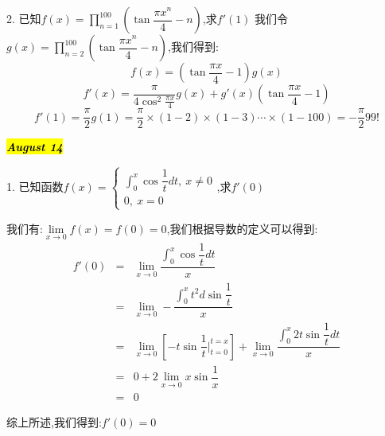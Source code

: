 2. 已知$f(x)=\prod\limits_{n=1}^{100}\left(\tan\dfrac{\pi x^n}{4}-n\right)$,求$f'(1)$
我们令$g(x)=\prod\limits_{n=2}^{100}\left(\tan\dfrac{\pi x^n}{4}-n\right)$,我们得到:$$f(x)=(\tan\dfrac{\pi x}{4}-1)g(x)$$
$$f'(x)=\dfrac{\pi}{4\cos^2\frac{\pi x}{4}}g(x)+g'(x)(\tan\dfrac{\pi x}{4}-1)$$
$$f'(1)=\dfrac{\pi}{2}g(1)=\dfrac{\pi}{2}\times(1-2)\times(1-3)\cdots\times(1-100)=-\dfrac{\pi}{2}99!$$

\hl{\textbf{\textit{August 14}}}

1. 已知函数$f(x)=\left\lbrace
\begin{array}{l}
	\int_{0}^{x}\cos\dfrac{1}{t}dt,\ x\neq 0\\
	0,\ x=0
\end{array}
\right. $,求$f'(0)$
\begin{solution}

	我们有:$\lim\limits_{x\rightarrow 0}f(x)=f(0)=0$,我们根据导数的定义可以得到:  
	\begin{eqnarray*}
		f'(0)&=&\lim\limits_{x\rightarrow 0}\dfrac{\int_{0}^{x}\cos\dfrac{1}{t}dt}{x}\\
		&=&\lim\limits_{x\rightarrow 0}-\dfrac{\int_{0}^{x}t^2d\sin\dfrac{1}{t}}{x}\\
		&=&\lim\limits_{x\rightarrow 0}\left[ -t\sin\dfrac{1}{t}|_{t=0}^{t=x}\right]+\lim\limits_{x\rightarrow 0}\dfrac{\int_{0}^{x}2t\sin\dfrac{1}{t}dt}{x}\\
		&=&0+2\lim\limits_{x\rightarrow 0}x\sin\dfrac{1}{x}\\
		&=&0
	\end{eqnarray*}

	综上所述,我们得到:$f'(0)=0$
\end{solution}

